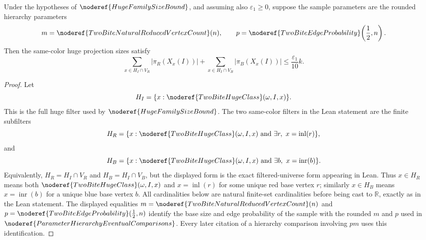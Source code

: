 \begin{lemma}
Under the hypotheses of \(\noderef{HugeFamilySizeBound}\), and assuming also
\(\varepsilon_1\ge0\), suppose the sample parameters are the rounded hierarchy
parameters
\[
m=\noderef{TwoBiteNaturalReducedVertexCount}(n),
\qquad
p=\noderef{TwoBiteEdgeProbability}\!\left(\frac12,n\right).
\]
Then the same-color huge projection sizes satisfy
\[
\sum_{x\in H_I\cap V_R}|\pi_R(X_x(I))|
+
\sum_{x\in H_I\cap V_B}|\pi_B(X_x(I))|
\le \frac{\varepsilon_1}{10}k.
\]
\end{lemma}
\begin{proof}
Let
\[
H_I=\{x:\noderef{TwoBiteHugeClass}(\omega,I,x)\}.
\]
This is the full huge filter used by \(\noderef{HugeFamilySizeBound}\).  The
two same-color filters in the Lean statement are the finite subfilters
\[
H_R=\{x:\noderef{TwoBiteHugeClass}(\omega,I,x)\ \text{and}\ 
      \exists r,\ x=\operatorname{inl}(r)\},
\]
and
\[
H_B=\{x:\noderef{TwoBiteHugeClass}(\omega,I,x)\ \text{and}\ 
      \exists b,\ x=\operatorname{inr}(b)\}.
\]
Equivalently, \(H_R=H_I\cap V_R\) and \(H_B=H_I\cap V_B\), but the displayed
form is the exact filtered-universe form appearing in Lean.  Thus \(x\in H_R\)
means both \(\noderef{TwoBiteHugeClass}(\omega,I,x)\) and
\(x=\operatorname{inl}(r)\) for some unique red base vertex \(r\); similarly
\(x\in H_B\) means \(x=\operatorname{inr}(b)\) for a unique blue base vertex
\(b\).  All cardinalities below are natural finite-set cardinalities before
being cast to \(\mathbb R\), exactly as in the Lean statement.
The displayed equalities \(m=\noderef{TwoBiteNaturalReducedVertexCount}(n)\)
and \(p=\noderef{TwoBiteEdgeProbability}(\frac12,n)\) identify the base size
and edge probability of the sample with the rounded \(m\) and \(p\) used in
\(\noderef{ParameterHierarchyEventualComparisons}\).  Every later citation of
a hierarchy comparison involving \(pm\) uses this identification.


\end{proof}

